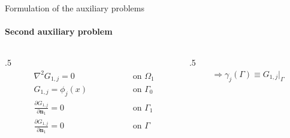 \documentclass[aspectratio=169]{beamer}
\begin{document}
\begin{frame}{Formulation of the auxiliary problems}
	\framesubtitle{Second auxiliary problem}
	\begin{columns}
	\begin{column}{.5\textwidth}
	\begin{subequations}
		\begin{alignat*}{2}
		& \nabla^2 G_{1,j} = 0 \quad\quad\quad\quad\quad && \text{ on } \Omega_1  \\ 
		& G_{1,j} = \phi_j(x) && \text{ on } \Gamma_0  \\
		& \frac{\partial G_{1,j}}{\partial \mathbf{n}_1} = 0 && \text{ on }  \Gamma_1  \\ 
		& \frac{\partial G_{1,j}}{\partial\mathbf{n}_1} = 0 \quad\quad\quad\quad\quad && \text{ on }  \Gamma 
		\end{alignat*}
	\end{subequations}
	\end{column}

	\begin{column}{.5\textwidth}
		\begin{align*}
		\Rightarrow \gamma_j(\Gamma) \equiv G_{1,j}\big|_\Gamma
	\end{align*}
	\end{column}
	\end{columns}

	\begin{center}
	\end{center}
\end{frame}
\end{document}
